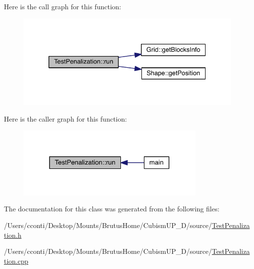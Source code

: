 Here is the call graph for this function\+:\nopagebreak
\begin{figure}[H]
\begin{center}
\leavevmode
\includegraphics[width=325pt]{d0/d08/class_test_penalization_a07dd4934e33caef13325d9599273ecee_cgraph}
\end{center}
\end{figure}




Here is the caller graph for this function\+:\nopagebreak
\begin{figure}[H]
\begin{center}
\leavevmode
\includegraphics[width=263pt]{d0/d08/class_test_penalization_a07dd4934e33caef13325d9599273ecee_icgraph}
\end{center}
\end{figure}




The documentation for this class was generated from the following files\+:\begin{DoxyCompactItemize}
\item 
/\+Users/cconti/\+Desktop/\+Mounts/\+Brutus\+Home/\+Cubism\+U\+P\+\_\+D/source/\hyperlink{_test_penalization_8h}{Test\+Penalization.\+h}\item 
/\+Users/cconti/\+Desktop/\+Mounts/\+Brutus\+Home/\+Cubism\+U\+P\+\_\+D/source/\hyperlink{_test_penalization_8cpp}{Test\+Penalization.\+cpp}\end{DoxyCompactItemize}

